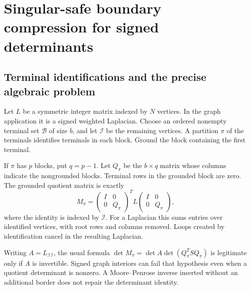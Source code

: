 \documentclass[11pt]{article}
\theoremstyle{definition}
\theoremstyle{remark}
\begin{document}
\section{Singular-safe boundary compression for signed determinants}
\label{sec:kernel}

\subsection{Terminal identifications and the precise algebraic problem}
Let $L$ be a symmetric integer matrix indexed by $N$ vertices. In the graph
application it is a signed weighted Laplacian. Choose an ordered nonempty
terminal set $\mathcal B$ of size $b$, and let $\mathcal I$ be the remaining
vertices. A partition $\pi$ of the terminals identifies terminals in each
block. Ground the block containing the first terminal.

If $\pi$ has $p$ blocks, put $q=p-1$. Let $Q_\pi$ be the $b\times q$ matrix
whose columns indicate the nongrounded blocks. Terminal rows in the grounded
block are zero. The grounded quotient matrix is exactly
\begin{equation}\label{eq:quotient}
 M_\pi=
 \begin{pmatrix}I&0\\0&Q_\pi\end{pmatrix}^{\!T}
 L
 \begin{pmatrix}I&0\\0&Q_\pi\end{pmatrix},
\end{equation}
where the identity is indexed by $\mathcal I$. For a Laplacian this sums
entries over identified vertices, with root rows and columns removed.
Loops created by identification cancel in the resulting Laplacian.

Writing $A=L_{\mathcal I\mathcal I}$, the usual formula
$\det M_\pi=\det A\det(Q_\pi^T S Q_\pi)$ is legitimate only if $A$ is
invertible. Signed graph interiors can fail that hypothesis even when a
quotient determinant is nonzero. A Moore--Penrose inverse inserted without
an additional border does not repair the determinant identity.
\end{document}
